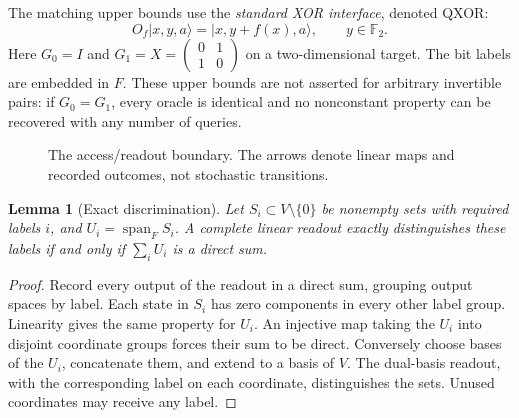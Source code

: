\documentclass[11pt]{article}
\newtheorem{lemma}[theorem]{Lemma}
\newcommand{\F}{\mathbb F}
\DeclareMathOperator{\Span}{span}
\begin{document}
The matching upper bounds use the \emph{standard XOR interface}, denoted QXOR:
\[
 O_f\lvert x,y,a\rangle=\lvert x,y+f(x),a\rangle,
 \qquad y\in\F_2.
\]
Here $G_0=I$ and $G_1=X=\left(\begin{smallmatrix}0&1\\1&0\end{smallmatrix}\right)$ on a two-dimensional target. The bit labels are embedded in $F$. These upper bounds are not asserted for arbitrary invertible pairs: if $G_0=G_1$, every oracle is identical and no nonconstant property can be recovered with any number of queries.

\begin{figure}[ht]\centering
{}
\caption{The access/readout boundary. The arrows denote linear maps and recorded outcomes, not stochastic transitions.}\label{fig:contract}
\end{figure}

\begin{lemma}[Exact discrimination]\label{lem:discrimination}
Let $S_i\subset V\setminus\{0\}$ be nonempty sets with required labels $i$, and $U_i=\Span_F S_i$. A complete linear readout exactly distinguishes these labels if and only if $\sum_iU_i$ is a direct sum.
\end{lemma}
\begin{proof}
Record every output of the readout in a direct sum, grouping output spaces by label. Each state in $S_i$ has zero components in every other label group. Linearity gives the same property for $U_i$. An injective map taking the $U_i$ into disjoint coordinate groups forces their sum to be direct. Conversely choose bases of the $U_i$, concatenate them, and extend to a basis of $V$. The dual-basis readout, with the corresponding label on each coordinate, distinguishes the sets. Unused coordinates may receive any label.
\end{proof}
\end{document}
